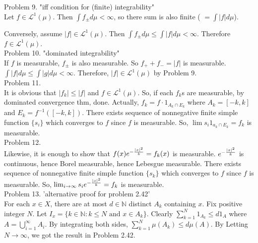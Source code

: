 Problem 9. "iff condition for (finite) integrability"\\

Let $f\in \mathcal{L}^1(\mu)$. Then $\int f_{\pm} d\mu < \infty$, so there sum is also finite ( $= \int \lvert f \rvert d\mu$).

Conversely, assume $\lvert f \rvert \in \mathcal{L}^1(\mu)$. Then $\int f_{\pm} d\mu \leq \int \lvert f \rvert d\mu < \infty$. Therefore $f \in \mathcal{L}^1(\mu)$.\\

Problem 10. "dominated integrability"\\

If $f$ is measurable, $f_{\pm}$ is also measurable. So $f_+ + f_- = \lvert f \rvert $ is measurable.
$\int \lvert f \rvert d\mu \leq \int \lvert g \rvert d\mu < \infty$. 
Therefore, $\lvert f \rvert \in \mathcal{L}^1(\mu)$ by Problem 9.\\

Problem 11. \\

It is obvious that $ \lvert f_k \rvert \leq \lvert f \rvert$ and $f \in \mathcal{L}^1(\mu)$.
So, if each $f_k$s are measurable, by dominated convergence thm, done.
Actually, $f_k = f \cdot 1_{A_k \cap E_k}$ where $A_k = \left [ -k, k \right ]$ and $E_k = f^{-1} (\left [ -k, k \right])$.
There exists sequence of nonnegative finite simple function $\{s_i\}$ which converges to $f$ since $f$ is measurable.
So, $\lim s_i 1_{a_k \cap E_k} = f_k$ is measurable.\\

Problem 12. \\

Likewise, it is enough to show that $f(x) e^{-{ {\lvert x \rvert}^2 \over k}} = f_k(x)$ is measurable.
$e^{-{ {\lvert x \rvert}^2 \over k}}$ is continuous, hence Borel measurable, hence Lebesgue measurable.
There exists sequence of nonnegative finite simple function $\{s_k \}$ which converges to $f$ since $f$ is measurable.
So, $\lim_{i \rightarrow \infty} s_i e^{-{ {\lvert x \rvert}^2 \over k}} = f_k$ is measurable. \\

Problem 13. 'alternative proof for problem 2.42' \\

For each $x \in X$, there are at most $d\in \mathbb{N}$ distinct $A_k$ containing $x$.
Fix positive integer $N$. Let $I_x = \{ k \in \mathbb{N} : k \leq N \text{ and } x\in A_k\}$.
Clearly $\sum_{k=1}^N 1_{A_k} \leq d 1_A$ where $A = \bigcup_{i=1}^{\infty}A_i$.
By integrating both sides, $\sum_{k=1}^N \mu(A_k) \leq d \mu(A)$.
By Letting $N \rightarrow \infty$, we got the result in Problem 2.42.

